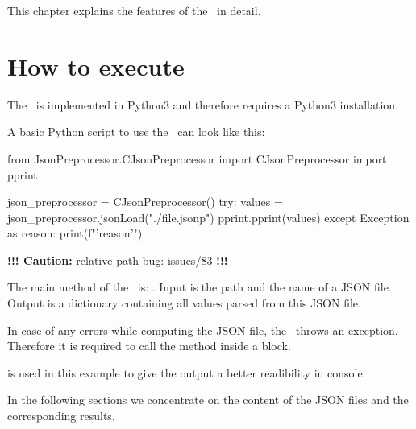 



This chapter explains the features of the \pkg\ in detail.

\section{How to execute}

The \pkg\ is implemented in Python3 and therefore requires a Python3 installation.

A basic Python script to use the \pkg\ can look like this:

\begin{pythoncode}
from JsonPreprocessor.CJsonPreprocessor import CJsonPreprocessor
import pprint

json_preprocessor = CJsonPreprocessor()
try:
   values = json_preprocessor.jsonLoad("./file.jsonp")
   pprint.pprint(values)
except Exception as reason:
   print(f"'{reason}'")
\end{pythoncode}

\textbf{!!! Caution:} relative path bug:
\href{https://github.com/test-fullautomation/python-jsonpreprocessor/issues/83}{issues/83} \textbf{!!!}


The main method of the \pkg\ is: . Input is the path and the name of a JSON file.
Output is a dictionary containing all values parsed from this JSON file.

In case of any errors while computing the JSON file, the \pkg\ throws an exception. Therefore it is required
to call the method  inside a  block.

 is used in this example to give the output a better readibility in console.

In the following sections we concentrate on the content of the JSON files and the corresponding results.

